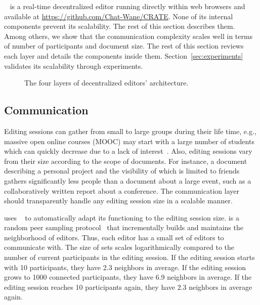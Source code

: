 \CRATE~\cite{nedelec2016crate} is a real-time decentralized editor running
directly within web browsers and available at
\url{https://github.com/Chat-Wane/CRATE}. None of its internal components
prevent its scalability. The rest of this section describes them. Among others,
we show that the communication complexity scales well in terms of number of
participants and document size. The rest of this section reviews each layer and
details the components inside them. Section~\ref{sec:experiments} validates its
scalability through experiments.

\begin{figure}
  \centering
  
  \caption{\label{fig:architecture}The four layers of decentralized editors'
    architecture.}
\end{figure}

\subsection{Communication}
\label{subsec:communication}

Editing sessions can gather from small to large groups during their life time,
e.g., massive open online courses (MOOC) may start with a large number of
students which can quickly decrease due to a lack of
interest~\cite{breslow2013studying}. Also, editing sessions vary from their size
according to the scope of documents. For instance, a document describing a
personal project and the visibility of which is limited to friends gathers
significantly less people than a document about a large event, such as a
collaboratively written report about a conference. The communication layer
should transparently handle any editing session size in a scalable manner.


\CRATE uses \SPRAY~\cite{nedelec2015spray} to automatically adapt its
functioning to the editing session size. \SPRAY is a random peer sampling
protocol~\cite{jelasity2007gossip} that incrementally builds and maintains the
neighborhood of editors. Thus, each editor has a small set of editors to
communicate with. The size of sets scales logarithmically compared to the number
of current participants in the editing session. If the editing session starts
with 10 participants, they have 2.3 neighbors in average. If the editing session
grows to 1000 connected participants, they have 6.9 neighbors in average. If the
editing session reaches 10 participants again, they have 2.3 neighbors in
average again.

